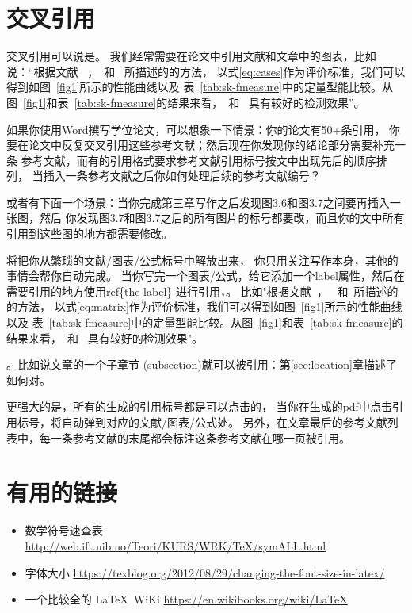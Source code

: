 \documentclass[UTF8]{ctexart}
\numberwithin{equation}{section} %
\numberwithin{table}{section} %
\begin{document}
\section{交叉引用}\label{sec:ref}
交叉引用可以说是。
我们经常需要在论文中引用文献和文章中的图表，比如说：“根据文献
~\cite{shen2017label}，~\cite{shen2016object}和~\cite{shen2017deepskeleton}
所描述的的方法，
以式\ref{eq:cases}作为评价标准，我们可以得到如图~\ref{fig1}所示的性能曲线以及
表~\ref{tab:sk-fmeasure}中的定量型能比较。从图~\ref{fig1}和表~\ref{tab:sk-fmeasure}的结果来看，~\cite{shen2016object}和~\cite{shen2017deepskeleton}
具有较好的检测效果”。

如果你使用Word撰写学位论文，可以想象一下情景：你的论文有50+条引用，
你要在论文中反复交叉引用这些参考文献；然后现在你发现你的绪论部分需要补充一条
参考文献，而有的引用格式要求参考文献引用标号按文中出现先后的顺序排列，
当插入一条参考文献之后你如何处理后续的参考文献编号？


或者有下面一个场景：当你完成第三章写作之后发现图3.6和图3.7之间要再插入一张图，然后
你发现图3.7和图3.7之后的所有图片的标号都要改，而且你的文中所有引用到这些图的地方都需要修改。

\textbf{}将把你从繁琐的文献/图表/公式标号中解放出来，
你只用关注写作本身，其他的事情会帮你自动完成。
%
当你写完一个图表/公式，给它添加一个label属性，然后在需要引用的地方使用ref\{the-label\}
进行引用，。
%
比如"根据文献~\cite{shen2017label}，~\cite{shen2016object}
和~\cite{shen2017deepskeleton}所描述的的方法，
以式\ref{eq:matrix}作为评价标准，我们可以得到如图~\ref{fig1}所示的性能曲线以及
表~\ref{tab:sk-fmeasure}中的定量型能比较。从图~\ref{fig1}和表~\ref{tab:sk-fmeasure}的结果来看，~\cite{shen2016object}和~\cite{shen2017deepskeleton}
具有较好的检测效果"。

。比如说文章的一个子章节
(subsection)就可以被引用：第\ref{sec:location}章描述了如何对。

更强大的是，所有的生成的引用标号都是可以点击的，
当你在生成的pdf中点击引用标号，将自动弹到对应的文献/图表/公式处。
%
另外，在文章最后的参考文献列表中，每一条参考文献的末尾都会标注这条参考文献在哪一页被引用。

%


\section{有用的链接}
\begin{itemize}
  \item 数学符号速查表 \url{http://web.ift.uib.no/Teori/KURS/WRK/TeX/symALL.html}
  \item 字体大小 \url{https://texblog.org/2012/08/29/changing-the-font-size-in-latex/}
  \item 一个比较全的 \LaTeX \ WiKi \url{https://en.wikibooks.org/wiki/LaTeX}
\end{itemize}
\end{document}
